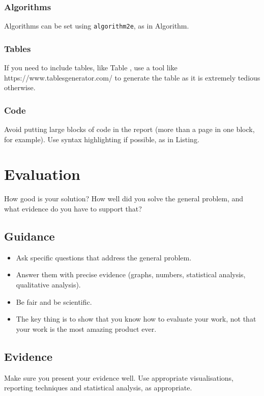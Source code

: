 \documentclass{l4proj}
\begin{document}
\subsection{Algorithms}

Algorithms can be set using \texttt{algorithm2e}, as in Algorithm.

\subsection{Tables}

If you need to include tables, like Table , use a tool like https://www.tablesgenerator.com/ to generate the table as it is extremely tedious otherwise.

\subsection{Code}

Avoid putting large blocks of code in the report (more than a page in one block, for example). Use syntax highlighting if possible, as in Listing.


\chapter{Evaluation}
How good is your solution? How well did you solve the general problem, and what evidence do you have to support that?

\section{Guidance}

\begin{itemize}
    \item
          Ask specific questions that address the general problem.
    \item
          Answer them with precise evidence (graphs, numbers, statistical
          analysis, qualitative analysis).
    \item
          Be fair and be scientific.
    \item
          The key thing is to show that you know how to evaluate your work, not
          that your work is the most amazing product ever.
\end{itemize}

\section{Evidence}
Make sure you present your evidence well. Use appropriate visualisations, reporting techniques and statistical analysis, as appropriate.
\end{document}
